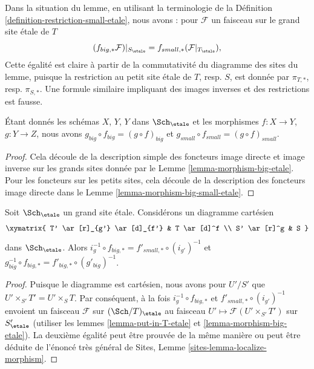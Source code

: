 \noindent
Dans la situation du lemme, en utilisant la terminologie de la Définition \ref{definition-restriction-small-etale}, nous avons : pour $\mathcal{F}$ un faisceau sur le grand site étale de $T$
$$
(f_{big, *}\mathcal{F})|_{S_\etale} =
f_{small, *}(\mathcal{F}|_{T_\etale}),
$$
Cette égalité est claire à partir de la commutativité du diagramme des sites du lemme, puisque la restriction au petit site étale de $T$, resp. $S$, est donnée par $\pi_{T, *}$, resp. $\pi_{S, *}$. Une formule similaire impliquant des images inverses et des restrictions est fausse.

\begin{lemma}
\label{lemma-composition-etale}
Étant donnés les schémas $X$, $Y$, $Y$ dans $\Sch_\etale$ et les morphismes $f : X \to Y$, $g : Y \to Z$, nous avons $g_{big} \circ f_{big} = (g \circ f)_{big}$ et $g_{small} \circ f_{small} = (g \circ f)_{small}$.
\end{lemma}

\begin{proof}
Cela découle de la description simple des foncteurs image directe et image inverse sur les grands sites donnée par le Lemme \ref{lemma-morphism-big-etale}. Pour les foncteurs sur les petits sites, cela découle de la description des foncteurs image directe dans le Lemme \ref{lemma-morphism-big-small-etale}.
\end{proof}

\begin{lemma}
\label{lemma-morphism-big-small-cartesian-diagram-etale}
Soit $\Sch_\etale$ un grand site étale. Considérons un diagramme cartésien
$$
\xymatrix{
T' \ar[r]_{g'} \ar[d]_{f'} & T \ar[d]^f \\
S' \ar[r]^g & S
}
$$
dans $\Sch_\etale$. Alors $i_g^{-1} \circ f_{big, *} = f'_{small, *} \circ (i_{g'})^{-1}$ et $g_{big}^{-1} \circ f_{big, *} = f'_{big, *} \circ (g'_{big})^{-1}$.
\end{lemma}

\begin{proof}
Puisque le diagramme est cartésien, nous avons pour $U'/S'$ que $U' \times_{S'} T' = U' \times_S T$. Par conséquent, à la fois $i_g^{-1} \circ f_{big, *}$ et $f'_{small, *} \circ (i_{g'})^{-1}$ envoient un faisceau $\mathcal{F}$ sur $(\Sch/T)_\etale$ au faisceau $U' \mapsto \mathcal{F}(U' \times_{S'} T')$ sur $S'_\etale$ (utiliser les lemmes \ref{lemma-put-in-T-etale} et \ref{lemma-morphism-big-etale}). La deuxième égalité peut être prouvée de la même manière ou peut être déduite de l'énoncé très général de Sites, Lemme \ref{sites-lemma-localize-morphism}.
\end{proof}


